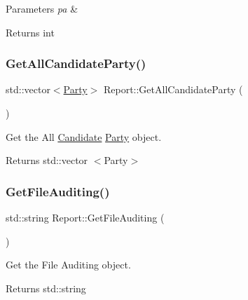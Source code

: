 \begin{DoxyParams}{Parameters}
{\em pa} & \\
\hline
\end{DoxyParams}
\begin{DoxyReturn}{Returns}
int 
\end{DoxyReturn}
\mbox{\label{classReport_a079f554f0c4b3c918f9a00bd83bdddd5}} 
\subsubsection{\texorpdfstring{Get\+All\+Candidate\+Party()}{GetAllCandidateParty()}}
{\footnotesize\ttfamily std\+::vector$<$\hyperlink{classParty}{Party}$>$ Report\+::\+Get\+All\+Candidate\+Party (\begin{DoxyParamCaption}{ }\end{DoxyParamCaption})\hspace{0.3cm}{\ttfamily [inline]}}



Get the All \hyperlink{classCandidate}{Candidate} \hyperlink{classParty}{Party} object. 

\begin{DoxyReturn}{Returns}
std\+::vector $<$\+Party$>$ 
\end{DoxyReturn}
\mbox{\label{classReport_a7c133617616e36a1a802260967d0bf96}} 
\subsubsection{\texorpdfstring{Get\+File\+Auditing()}{GetFileAuditing()}}
{\footnotesize\ttfamily std\+::string Report\+::\+Get\+File\+Auditing (\begin{DoxyParamCaption}{ }\end{DoxyParamCaption})\hspace{0.3cm}{\ttfamily [inline]}}



Get the File Auditing object. 

\begin{DoxyReturn}{Returns}
std\+::string 
\end{DoxyReturn}
\mbox{\label{classReport_a33195efe7c13185cdb887eb4e51176c8}} 

